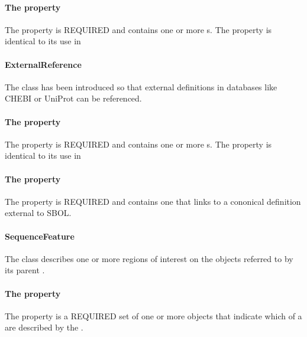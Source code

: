 \paragraph{The  property}\label{sec:type:ER}

The  property is REQUIRED and contains one or more s. The  property is identical to its use in 

\paragraph{ExternalReference}
\label{sec:ExternalReference}

The  class has been introduced so that external definitions in databases like CHEBI or UniProt can be referenced.

\paragraph{The  property}\label{sec:type:ER}

The  property is REQUIRED and contains one or more s. The  property is identical to its use in 

\paragraph{The  property}\label{sec:definition:ER}

The  property is REQUIRED and contains one  that links to a cononical definition external to SBOL.


\paragraph{SequenceFeature}
\label{sec:SequenceFeature}

The  class describes one or more regions of interest on the  objects referred to by its parent . 

\paragraph{The  property}\label{sec:locations}
The  property is a REQUIRED set of one or more  objects that indicate which  of a  are described by the .

